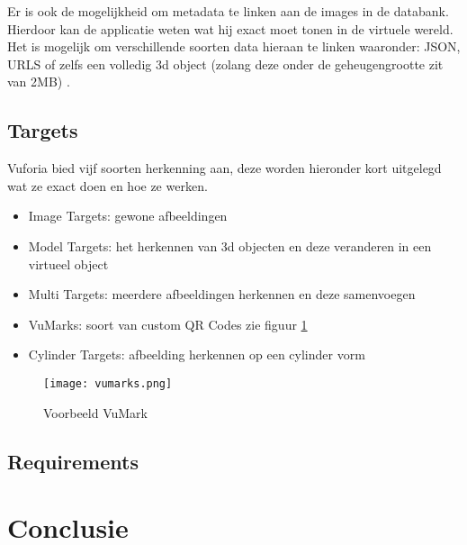 Er is ook de mogelijkheid om metadata te linken aan de images in de databank. Hierdoor kan de applicatie weten wat hij exact moet tonen in de virtuele wereld. Het is mogelijk om verschillende soorten data hieraan te linken waaronder: JSON, URLS of zelfs een volledig 3d object (zolang deze onder de geheugengrootte zit van 2MB) \autocite{VuforiaCloudReco}.



\subsection{Targets}
Vuforia bied vijf soorten herkenning aan, deze worden hieronder kort uitgelegd wat ze exact doen en hoe ze werken.

\begin{itemize}
    \item Image Targets: gewone afbeeldingen
    \item Model Targets: het herkennen van 3d objecten en deze veranderen in een virtueel object
    \item Multi Targets: meerdere afbeeldingen herkennen en deze samenvoegen
    \item VuMarks: soort van custom QR Codes zie figuur \ref{fig:vumarks}
    \item Cylinder Targets: afbeelding herkennen op een cylinder vorm
\end{itemize} 

\begin{figure}
    \texttt{[image: vumarks.png]}
    \caption{Voorbeeld VuMark}
    \label{fig:vumarks}
\end{figure}
\subsection{Requirements} 

\section{Conclusie}
